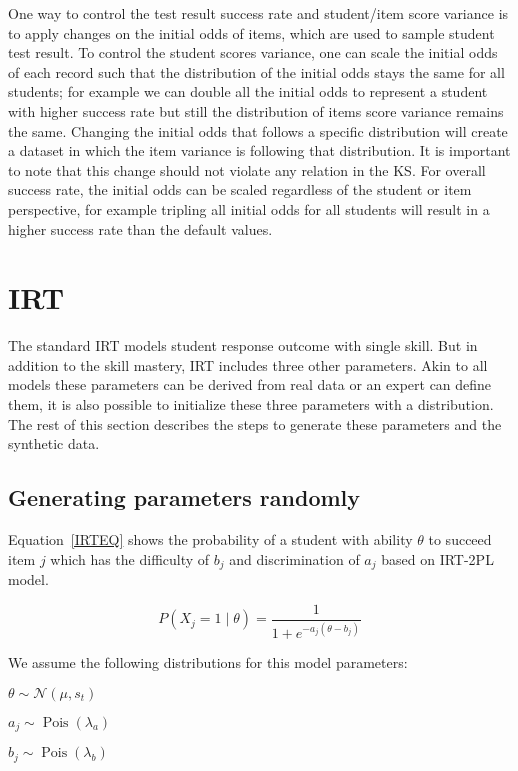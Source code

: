 One way to control the test result success rate and student/item score variance is to apply changes on the initial odds of items, which are used to sample student test result. To control the student scores variance, one can scale the initial odds of each record such that the distribution of the initial odds stays the same for all students; for example we can double all the initial odds to represent a student with higher success rate but still the distribution of items score variance remains the same. Changing the initial odds that follows a specific distribution will create a dataset in which the item variance is following that distribution. It is important to note that this change should not violate any relation in the KS. For overall success rate, the initial odds can be scaled regardless of the student or item perspective, for example tripling all initial odds for all students will result in a higher success rate than the default values. 



\section{IRT}

The standard IRT models student response outcome with single skill. But in addition to the skill mastery, IRT includes three other parameters. Akin to all models these parameters can be derived from real data or an expert can define them, it is also possible to initialize these three parameters with a distribution. The rest of this section describes the steps to generate these parameters and the synthetic data.

\subsection{Generating parameters randomly}
Equation~\ref{IRTEQ} shows the probability of a student with ability $\theta$ to succeed item $j$ which has the difficulty of $b_j$ and discrimination of $a_j$ based on IRT-2PL model. 

\newcommand\pN{\mathcal{N}}

\begin{equation}
P(X_j\!=\!1\;|\;\theta) = \frac{1}{1+e^{-a_j(\theta-b_j)}}
\label{IRTEQ}
\end{equation}

We assume the following distributions for this model parameters:

\begin{center}
$\theta \sim \pN(\mu, s_t)$

$a_j \sim \operatorname{Pois} \left({\lambda_a}\right)$

$b_j \sim \operatorname{Pois} \left({\lambda_b}\right)$
\end{center}


